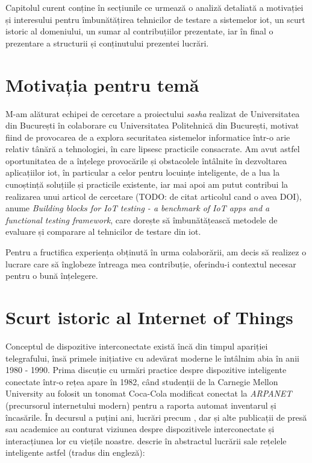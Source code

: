 Capitolul curent conține în secțiunile ce urmează o analiză detaliată a motivației și interesului pentru îmbunătățirea tehnicilor de testare a sistemelor \acrshort{iot}, un scurt istoric al domeniului, un sumar al contribuțiilor prezentate, iar în final o prezentare a structurii și conținutului prezentei lucrări.

\section{Motivația pentru temă}

M-am alăturat echipei de cercetare a proiectului \textit{\acrfull{sasha}} realizat de Universitatea din București în colaborare cu Universitatea Politehnică din București, motivat fiind de provocarea de a explora securitatea sistemelor informatice într-o arie relativ tânără a tehnologiei, în care lipsesc practicile consacrate. Am avut astfel oportunitatea de a înțelege provocările și obstacolele întâlnite în dezvoltarea aplicațiilor \acrshort{iot}, în particular a celor pentru locuințe inteligente, de a lua la cunoștință soluțiile și practicile existente, iar mai apoi am putut contribui la realizarea unui articol de cercetare (TODO: de citat articolul cand o avea DOI), anume \textit{Building blocks for IoT testing - a benchmark of IoT apps and a functional testing framework}, care dorește să îmbunătățească metodele de evaluare și comparare al tehnicilor de testare din \acrlong{iot}.

Pentru a fructifica experiența obținută în urma colaborării, am decis să realizez o lucrare care să înglobeze întreaga mea contribuție, oferindu-i contextul necesar pentru o bună înțelegere. 

\section{Scurt istoric al Internet of Things}


Conceptul de dispozitive interconectate există încă din timpul apariției telegrafului, însă primele inițiative cu adevărat moderne le întâlnim abia în anii 1980 - 1990. Prima discuție cu urmări practice despre dispozitive inteligente conectate într-o rețea apare în 1982, când studenții de la  Carnegie Mellon University au folosit un tonomat Coca-Cola modificat conectat la \textit{ARPANET} (precursorul internetului modern) pentru a raporta automat inventarul și încasările. În decursul a puțini ani, lucrări precum \cite{Weiser1999}, dar și alte publicații de presă sau academice au conturat viziunea despre dispozitivele interconectate și interacțiunea lor cu viețile noastre. \cite{Raji1994} descrie în abstractul lucrării sale rețelele inteligente astfel (tradus din engleză):

